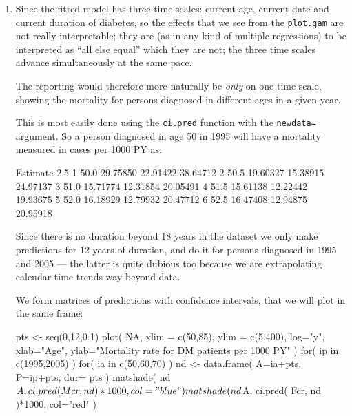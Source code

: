 \begin{enumerate}[resume]
\item Since the fitted model has three time-scales: current age,
  current date and current duration of diabetes, so the effects that
  we see from the \texttt{plot.gam} are not really interpretable; they
  are (as in any kind of multiple regressions) to be interpreted as
  ``all else equal'' which they are not; the three time scales
  advance simultaneously at the same pace.

  The reporting would therefore more naturally be \emph{only} on one
  time scale, showing the mortality for persons diagnosed in
  different ages in a given year.

  This is most easily done using the \texttt{ci.pred} function with
  the \texttt{newdata=} argument. So a person diagnosed in age 50 in
  1995 will have a mortality measured in cases per 1000 PY as:
\begin{Schunk}
\begin{Soutput}
       Estimate     2.5%    97.5%
1 50.0 29.75850 22.91422 38.64712
2 50.5 19.60327 15.38915 24.97137
3 51.0 15.71774 12.31854 20.05491
4 51.5 15.61138 12.22442 19.93675
5 52.0 16.18929 12.79932 20.47712
6 52.5 16.47408 12.94875 20.95918
\end{Soutput}
\end{Schunk}
Since there is no duration beyond 18 years in the dataset we only make
predictions for 12 years of duration, and do it for persons diagnosed
in 1995 and 2005 --- the latter is quite dubious too because we are
extrapolating calendar time trends way beyond data.
  
We form matrices of predictions with confidence intervals, that we
will plot in the same frame:
\begin{Schunk}
\begin{Sinput}
 pts <- seq(0,12,0.1)
 plot( NA, xlim = c(50,85), ylim = c(5,400), log="y",
           xlab="Age", ylab="Mortality rate for DM patients per 1000 PY" )
 for( ip in c(1995,2005) )
 for( ia in c(50,60,70) )
    {
 nd <- data.frame( A=ia+pts,
                   P=ip+pts,
                 dur=   pts )
 matshade( nd$A, ci.pred( Mcr, nd )*1000, col="blue" )
 matshade( nd$A, ci.pred( Fcr, nd )*1000, col="red" )
    }
\end{Sinput}
\end{Schunk}



\end{enumerate}
